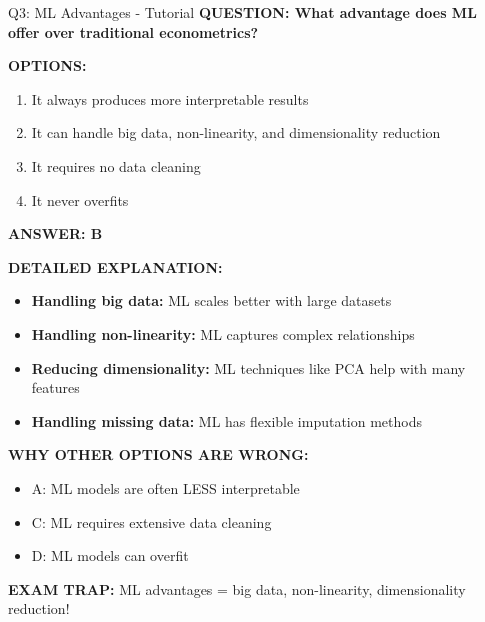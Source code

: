 \documentclass[8pt]{beamer}
\begin{document}
	\begin{frame}{Q3: ML Advantages - Tutorial}
		\fontsize{6.5}{7.5}\selectfont
		\textbf{QUESTION: What advantage does ML offer over traditional econometrics?}
		
		\vspace{0.1cm}
		\textbf{OPTIONS:}
		\begin{enumerate}
			\item It always produces more interpretable results
			\item It can handle big data, non-linearity, and dimensionality reduction
			\item It requires no data cleaning
			\item It never overfits
		\end{enumerate}
		
		\vspace{0.1cm}
		\textcolor{myblue}{\textbf{ANSWER: B}}
		
		\vspace{0.1cm}
		\textbf{DETAILED EXPLANATION:}
		\begin{itemize}
			\item \textbf{Handling big data:} ML scales better with large datasets
			\item \textbf{Handling non-linearity:} ML captures complex relationships
			\item \textbf{Reducing dimensionality:} ML techniques like PCA help with many features
			\item \textbf{Handling missing data:} ML has flexible imputation methods
		\end{itemize}
		
		\vspace{0.1cm}
		\textcolor{myred}{\textbf{WHY OTHER OPTIONS ARE WRONG:}}
		\begin{itemize}
			\item \textcolor{myred}{A:} ML models are often LESS interpretable
			\item \textcolor{myred}{C:} ML requires extensive data cleaning
			\item \textcolor{myred}{D:} ML models can overfit
		\end{itemize}
		
		\textcolor{myred}{\textbf{EXAM TRAP:}} ML advantages = \textcolor{myblue}{big data, non-linearity, dimensionality reduction}!
	\end{frame}
	
\end{document}
